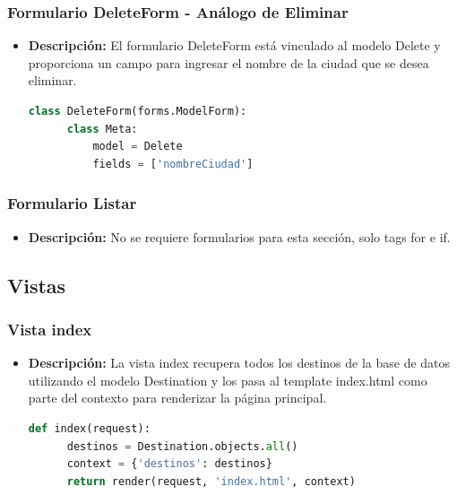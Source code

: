 \documentclass{article}
\begin{document}

  \subsubsection{Formulario DeleteForm - Análogo de Eliminar}
  \begin{itemize}
    \item \textbf{Descripción: }El formulario DeleteForm está vinculado al modelo Delete y proporciona un campo para ingresar 
    el nombre de la ciudad que se desea eliminar.
    \begin{lstlisting}[language=Python, caption={Formulario Eliminar}]
    class DeleteForm(forms.ModelForm):
      class Meta:
          model = Delete
          fields = ['nombreCiudad']
    \end{lstlisting}
  \end{itemize}
  

  \subsubsection{Formulario Listar}
  \begin{itemize}
    \item \textbf{Descripción: }No se requiere formularios para esta sección, solo tags for e if.
  \end{itemize}
  

  \subsection{Vistas}
  

  \subsubsection{Vista index}
  \begin{itemize}
    \item \textbf{Descripción: }La vista index recupera todos los destinos de la base de datos utilizando el modelo Destination 
    y los pasa al template index.html como parte del contexto para renderizar la página principal.
    \begin{lstlisting}[language=Python, caption={index}]
    def index(request):
      destinos = Destination.objects.all()
      context = {'destinos': destinos}
      return render(request, 'index.html', context)
    \end{lstlisting}
  \end{itemize}
  \newpage
  
\end{document}
